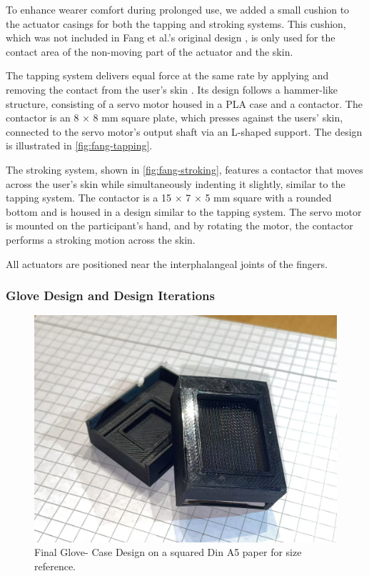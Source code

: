 To enhance wearer comfort during prolonged use, we added a small cushion to the actuator casings for both the tapping and stroking systems. This cushion, which was not included in Fang et al.’s original design \cite{Fang2023}, is only used for the contact area of the non-moving part of the actuator and the skin.

The tapping system delivers equal force at the same rate by applying and removing the contact from the user’s skin \cite{Fang2023}. Its design follows a hammer-like structure, consisting of a servo motor housed in a PLA case and a contactor. The contactor is an 8 × 8 mm square plate, which presses against the users' skin, connected to the servo motor’s output shaft via an L-shaped support. The design is illustrated in \autoref{fig:fang-tapping}.

The stroking system, shown in \autoref{fig:fang-stroking}, features a contactor that moves across the user’s skin while simultaneously indenting it slightly, similar to the tapping system. The contactor is a 15 × 7 × 5 mm square with a rounded bottom and is housed in a design similar to the tapping system. The servo motor is mounted on the participant’s hand, and by rotating the motor, the contactor performs a stroking motion across the skin.

All actuators are positioned near the interphalangeal joints of the fingers.


\subsubsection{Glove Design and Design Iterations}
\label{Glove_Design_Iteration}
\begin{figure}
    \centering
    \includegraphics[width=0.5\linewidth]{src/pictures/GloveDesigns/cases.jpg}
    \caption{Final Glove- Case Design on a squared Din A5 paper for size reference.}
    \label{fig:cases}
\end{figure}

